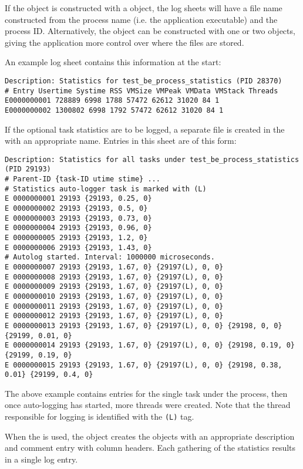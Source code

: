 If the  object is constructed with a 
object, the log sheets will have a file name constructed from the
process name (i.e. the application executable) and the process ID.
Alternatively, the  object can be constructed with one or
two  objects, giving the application more control over where
the files are stored.

An example log sheet contains this information at the start:

\begin{verbatim}
Description: Statistics for test_be_process_statistics (PID 28370)
# Entry Usertime Systime RSS VMSize VMPeak VMData VMStack Threads
E0000000001 728889 6998 1788 57472 62612 31020 84 1
E0000000002 1300802 6998 1792 57472 62612 31020 84 1
\end{verbatim}

If the optional task statistics are to be logged, a separate file is created
in the  with an appropriate name. Entries in this sheet are
of this form:

\begin{verbatim}
Description: Statistics for all tasks under test_be_process_statistics (PID 29193)
# Parent-ID {task-ID utime stime} ...
# Statistics auto-logger task is marked with (L)
E 0000000001 29193 {29193, 0.25, 0}
E 0000000002 29193 {29193, 0.5, 0}
E 0000000003 29193 {29193, 0.73, 0}
E 0000000004 29193 {29193, 0.96, 0}
E 0000000005 29193 {29193, 1.2, 0}
E 0000000006 29193 {29193, 1.43, 0}
# Autolog started. Interval: 1000000 microseconds.
E 0000000007 29193 {29193, 1.67, 0} {29197(L), 0, 0}
E 0000000008 29193 {29193, 1.67, 0} {29197(L), 0, 0}
E 0000000009 29193 {29193, 1.67, 0} {29197(L), 0, 0}
E 0000000010 29193 {29193, 1.67, 0} {29197(L), 0, 0}
E 0000000011 29193 {29193, 1.67, 0} {29197(L), 0, 0}
E 0000000012 29193 {29193, 1.67, 0} {29197(L), 0, 0}
E 0000000013 29193 {29193, 1.67, 0} {29197(L), 0, 0} {29198, 0, 0} {29199, 0.01, 0}
E 0000000014 29193 {29193, 1.67, 0} {29197(L), 0, 0} {29198, 0.19, 0} {29199, 0.19, 0}
E 0000000015 29193 {29193, 1.67, 0} {29197(L), 0, 0} {29198, 0.38, 0.01} {29199, 0.4, 0}
\end{verbatim}

The above example contains entries for the single task under the process, then
once auto-logging has started, more threads were created. Note that the thread
responsible for logging is identified with the {\tt (L)} tag.

When the  is used, the  object creates the
 objects with an appropriate description and comment entry with 
column headers. Each gathering of the statistics results in a single log entry.

